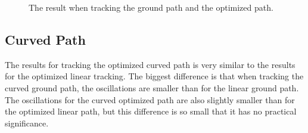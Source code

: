 \begin{figure}
	\caption{The result when tracking the ground path and the optimized path.}
	\label{fig:lin_sim_res}
\end{figure}



\subsection{Curved Path}

The results for tracking the optimized curved path is very similar to the results for the optimized linear tracking. The biggest difference is that when tracking the curved ground path, the oscillations are smaller than for the linear ground path. The oscillations for the curved optimized path are also slightly smaller than for the optimized linear path, but this difference is so small that it has no practical significance.


